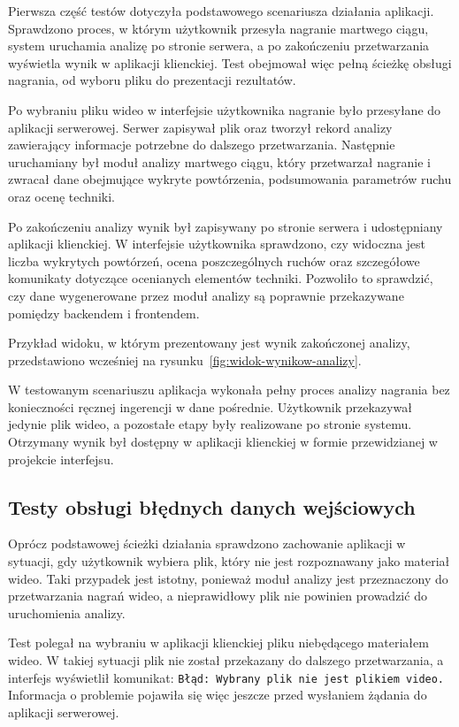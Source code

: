 Pierwsza część testów dotyczyła podstawowego scenariusza działania aplikacji. Sprawdzono proces, w którym użytkownik przesyła nagranie martwego ciągu, system uruchamia analizę po stronie serwera, a po zakończeniu przetwarzania wyświetla wynik w aplikacji klienckiej. Test obejmował więc pełną ścieżkę obsługi nagrania, od wyboru pliku do prezentacji rezultatów.

Po wybraniu pliku wideo w interfejsie użytkownika nagranie było przesyłane do aplikacji serwerowej. Serwer zapisywał plik oraz tworzył rekord analizy zawierający informacje potrzebne do dalszego przetwarzania. Następnie uruchamiany był moduł analizy martwego ciągu, który przetwarzał nagranie i zwracał dane obejmujące wykryte powtórzenia, podsumowania parametrów ruchu oraz ocenę techniki.

Po zakończeniu analizy wynik był zapisywany po stronie serwera i udostępniany aplikacji klienckiej. W interfejsie użytkownika sprawdzono, czy widoczna jest liczba wykrytych powtórzeń, ocena poszczególnych ruchów oraz szczegółowe komunikaty dotyczące ocenianych elementów techniki. Pozwoliło to sprawdzić, czy dane wygenerowane przez moduł analizy są poprawnie przekazywane pomiędzy backendem i frontendem.

Przykład widoku, w którym prezentowany jest wynik zakończonej analizy, przedstawiono wcześniej na rysunku~\ref{fig:widok-wynikow-analizy}.

W testowanym scenariuszu aplikacja wykonała pełny proces analizy nagrania bez konieczności ręcznej ingerencji w dane pośrednie. Użytkownik przekazywał jedynie plik wideo, a pozostałe etapy były realizowane po stronie systemu. Otrzymany wynik był dostępny w aplikacji klienckiej w formie przewidzianej w projekcie interfejsu.

\subsection{Testy obsługi błędnych danych wejściowych}

Oprócz podstawowej ścieżki działania sprawdzono zachowanie aplikacji w sytuacji, gdy użytkownik wybiera plik, który nie jest rozpoznawany jako materiał wideo. Taki przypadek jest istotny, ponieważ moduł analizy jest przeznaczony do przetwarzania nagrań wideo, a nieprawidłowy plik nie powinien prowadzić do uruchomienia analizy.

Test polegał na wybraniu w aplikacji klienckiej pliku niebędącego materiałem wideo. W takiej sytuacji plik nie został przekazany do dalszego przetwarzania, a interfejs wyświetlił komunikat: \texttt{Błąd: Wybrany plik nie jest plikiem video.} Informacja o problemie pojawiła się więc jeszcze przed wysłaniem żądania do aplikacji serwerowej.

